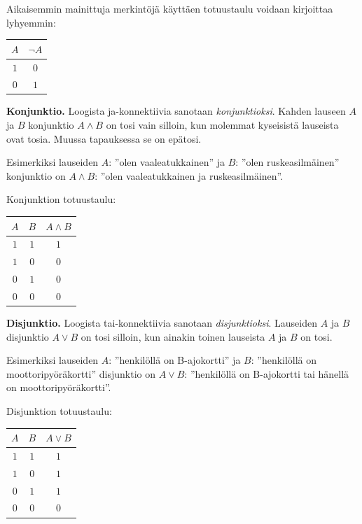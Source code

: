 \bigskip

Aikaisemmin mainittuja merkintöjä käyttäen totuustaulu voidaan kirjoittaa lyhyemmin:

\bigskip

\begin{center}
\begin{tabular}{|c|c|}\hline
$A$ & $\lnot A$ \\ \hline
$1$ & $0$\\ 
$0$ & $1$ \\ \hline
\end{tabular}
\end{center}

\bigskip

{\bf Konjunktio.} Loogista ja-konnektiivia sanotaan {\em konjunktioksi}. Kahden lauseen $A$ ja $B$ konjunktio $A\land B$ on tosi vain silloin, kun molemmat kyseisistä lauseista ovat tosia. Muussa tapauksessa se on epätosi.

Esimerkiksi lauseiden $A$: ''olen vaaleatukkainen'' ja $B$: ''olen ruskeasilmäinen'' konjunktio on $A \land B$: ''olen vaaleatukkainen ja ruskeasilmäinen''. 


Konjunktion totuustaulu:

\bigskip

\begin{center}
\begin{tabular}{|c|c|c|}\hline
$A$ & $B$ & $A\land B$ \\ \hline
$1$ & $1$ & $1$\\ 
$1$ & $0$ & $0$\\
$0$ & $1$ & $0$\\
$0$ & $0$ & $0$\\
\hline
\end{tabular}
\end{center}

\bigskip

{\bf Disjunktio.} Loogista tai-konnektiivia sanotaan {\em disjunktioksi}. Lauseiden $A$ ja $B$ disjunktio $A\lor B$ on tosi silloin, kun ainakin toinen lauseista $A$ ja $B$ on tosi.

Esimerkiksi lauseiden $A$: ''henkilöllä on B-ajokortti'' ja $B$: ''henkilöllä on moottoripyöräkortti'' disjunktio on $A \lor B$: ''henkilöllä on B-ajokortti tai hänellä on moottoripyöräkortti''. 

Disjunktion totuustaulu:
 
\bigskip

\begin{center}
\begin{tabular}{|c|c|c|}\hline
$A$ & $B$ & $A\lor B$ \\ \hline
$1$ & $1$ & $1$\\ 
$1$ & $0$ & $1$\\
$0$ & $1$ & $1$\\
$0$ & $0$ & $0$\\ \hline
\end{tabular}
\end{center}

